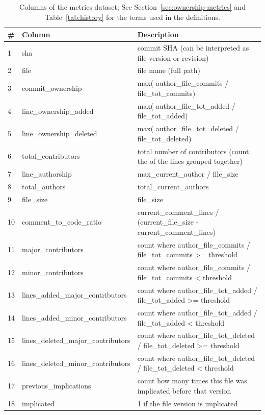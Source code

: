 \begin{table}[t]
\centering
\caption{Columns of the metrics dataset;  See Section~\ref{sec:ownership-metrics} and Table~\ref{tab:history} for the terms used in the definitions.}
\label{tab:metrics}
\footnotesize
\begin{tabular}{|l|l|p{}|}
\hline
\# & \textbf{Column} & \textbf{Description}  \\
\hline
1 & sha & 
    commit SHA (can be interpreted as file version or revision) \\ \hline
2 & file & 
    file name (full path)\\ \hline
3 & commit\_ownership & 
    max( author\_file\_commits / file\_tot\_commits)\\ \hline
4 & line\_ownership\_added & 
    max( author\_file\_tot\_added / file\_tot\_added)\\ \hline
5 & line\_ownership\_deleted & 
    max( author\_file\_tot\_deleted / file\_tot\_deleted)\\ \hline
6 & total\_contributors & 
    total number of contributors (count the of the lines grouped together) \\ \hline %
7 & line\_authorship & 
    max\_current\_author / file\_size \\ \hline
8 & total\_authors & 
    total\_current\_authors\\ \hline
9 & file\_size & 
    file\_size\\ \hline
10 & comment\_to\_code\_ratio & 
    current\_comment\_lines / (current\_file\_size - current\_comment\_lines)\\ \hline
11 & major\_contributors & 
    count where author\_file\_commits / file\_tot\_commits >= threshold\\ \hline
12 & minor\_contributors & 
    count where author\_file\_commits / file\_tot\_commits < threshold\\ \hline
13 & lines\_added\_major\_contributors & 
    count where author\_file\_tot\_added / file\_tot\_added >= threshold\\ \hline
14 & lines\_added\_minor\_contributors & 
    count where author\_file\_tot\_added / file\_tot\_added < threshold\\ \hline
15 & lines\_deleted\_major\_contributors & 
    count where author\_file\_tot\_deleted / file\_tot\_deleted >= threshold\\ \hline
16 & lines\_deleted\_minor\_contributors & 
    count where author\_file\_tot\_deleted / file\_tot\_deleted < threshold\\ \hline
17 & previous\_implications &
    count how many times this file was implicated before that version\\\hline
18 & implicated & 1 if the file version is implicated \\\hline
\end{tabular}
\end{table}

